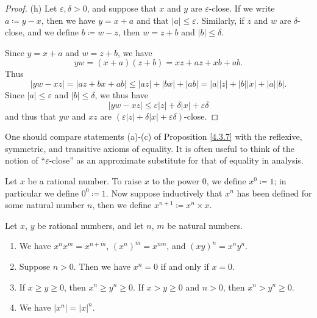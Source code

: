 \begin{proof}{(h)}
Let \(\varepsilon, \delta > 0\), and suppose that \(x\) and \(y\) are \(\varepsilon\)-close.
If we write \(a \coloneqq y - x\), then we have \(y = x + a\) and that \(|a| \leq \varepsilon\).
Similarly, if \(z\) and \(w\) are \(\delta\)-close, and we define \(b \coloneqq w - z\), then \(w = z + b\) and \(|b| \leq \delta\).

Since \(y = x + a\) and \(w = z + b\), we have
\[
    yw = (x + a)(z + b) = xz + az + xb + ab.
\]
Thus
\[
    |yw - xz| = |az + bx + ab| \leq |az| + |bx| + |ab| = |a||z| + |b||x| + |a||b|.
\]
Since \(|a| \leq \varepsilon\) and \(|b| \leq \delta\), we thus have
\[
    |yw - xz| \leq \varepsilon|z| + \delta|x| + \varepsilon\delta
\]
and thus that \(yw\) and \(xz\) are \((\varepsilon|z| + \delta|x| + \varepsilon\delta)\)-close.
\end{proof}

\begin{remark}\label{4.3.8}
One should compare statements (a)-(c) of Proposition \ref{4.3.7} with the reflexive, symmetric, and transitive axioms of equality.
It is often useful to think of the notion of ``\(\varepsilon\)-close'' as an approximate substitute for that of equality in analysis.
\end{remark}

\begin{definition}\label{4.3.9}
Let \(x\) be a rational number.
To raise \(x\) to the power \(0\), we define \(x^0 \coloneqq 1\);
in particular we define \(0^0 \coloneqq 1\).
Now suppose inductively that \(x^n\) has been defined for some natural number \(n\), then we define \(x^{n+1} \coloneqq x^n \times x\).
\end{definition}

\begin{proposition}\label{4.3.10}
Let \(x\), \(y\) be rational numbers, and let \(n\), \(m\) be natural numbers.
\begin{enumerate}
    \item We have \(x^n x^m = x^{n + m}\), \((x^n)^m = x^{nm}\), and \((xy)^n = x^n y^n\).
    \item Suppose \(n > 0\).
    Then we have \(x^n = 0\) if and only if \(x = 0\).
    \item If \(x \geq y \geq 0\), then \(x^n \geq y^n \geq 0\).
    If \(x > y \geq 0\) and \(n > 0\), then \(x^n > y^n \geq 0\).
    \item We have \(|x^n| = |x|^n\).
\end{enumerate}
\end{proposition}

